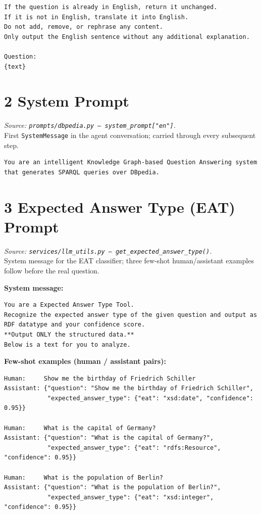 \documentclass[11pt,a4paper]{article}
\begin{document}
\begin{lstlisting}[style=prompt]
If the question is already in English, return it unchanged.
If it is not in English, translate it into English.
Do not add, remove, or rephrase any content.
Only output the English sentence without any additional explanation.

Question:
{text}
\end{lstlisting}

\section{2 \quad System Prompt}
\textit{Source: \texttt{prompts/dbpedia.py --- system\_prompt["en"]}.}\\
First \texttt{SystemMessage} in the agent conversation; carried through every subsequent step.

\begin{lstlisting}[style=prompt]
You are an intelligent Knowledge Graph-based Question Answering system that generates SPARQL queries over DBpedia.
\end{lstlisting}

\section{3 \quad Expected Answer Type (EAT) Prompt}
\textit{Source: \texttt{services/llm\_utils.py --- get\_expected\_answer\_type()}.}\\
System message for the EAT classifier; three few-shot human/assistant examples follow before the real question.

\textbf{System message:}
\begin{lstlisting}[style=prompt]
You are a Expected Answer Type Tool.
Recognize the expected answer type of the given question and output as
RDF datatype and your confidence score.
**Output ONLY the structured data.**
Below is a text for you to analyze.
\end{lstlisting}
\textbf{Few-shot examples (human / assistant pairs):}
\begin{lstlisting}[style=prompt]
Human:     Show me the birthday of Friedrich Schiller
Assistant: {"question": "Show me the birthday of Friedrich Schiller",
            "expected_answer_type": {"eat": "xsd:date", "confidence": 0.95}}

Human:     What is the capital of Germany?
Assistant: {"question": "What is the capital of Germany?",
            "expected_answer_type": {"eat": "rdfs:Resource", "confidence": 0.95}}

Human:     What is the population of Berlin?
Assistant: {"question": "What is the population of Berlin?",
            "expected_answer_type": {"eat": "xsd:integer", "confidence": 0.95}}
\end{lstlisting}
\end{document}
